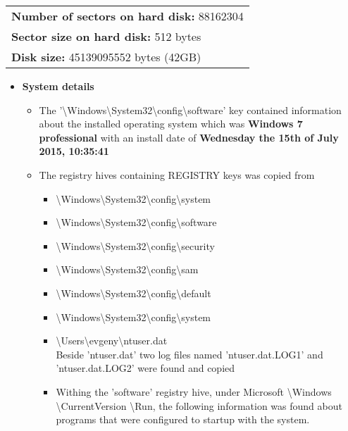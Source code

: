 \begin{enumerate}
\begin{tabular}{|l|}
	\textbf{Number of sectors on hard disk:} 88162304 \\
	\textbf{Sector size on hard disk:} 512 bytes \\
	\textbf{Disk size:} 45139095552 bytes (42GB) \\
	\hline
\end{tabular}

\begin{itemize}
	\newpage
	\item \textbf{System details}
	\begin{itemize}
		\item The {\footnotesize '\textbackslash Windows\textbackslash System32\textbackslash config\textbackslash software'} key contained information about the installed operating system which was
		\textbf{Windows 7 professional} with an install date of \textbf{Wednesday the 15th of July 2015, 10:35:41}

		\item The registry hives containing REGISTRY keys was copied from 
		\begin{itemize}
			\item \textbackslash Windows\textbackslash System32\textbackslash config\textbackslash system\\ 
			\item \textbackslash Windows\textbackslash System32\textbackslash config\textbackslash software\\
			\item \textbackslash Windows\textbackslash System32\textbackslash config\textbackslash security\\
			\item \textbackslash Windows\textbackslash System32\textbackslash config\textbackslash sam \\
			\item \textbackslash Windows\textbackslash System32\textbackslash config\textbackslash default \\
			\item \textbackslash Windows\textbackslash System32\textbackslash config\textbackslash system \\
			\item \textbackslash Users\textbackslash evgeny\textbackslash ntuser.dat \\
			Beside 'ntuser.dat' two log files named 'ntuser.dat.LOG1' and 'ntuser.dat.LOG2' were found and copied
			
			\item Withing the 'software' registry hive, under 
			Microsoft \textbackslash Windows \textbackslash CurrentVersion \textbackslash Run, the following information was found about programs that were configured to startup with the system.
			

\end{itemize}
\end{itemize}
\end{itemize}
\end{enumerate}
